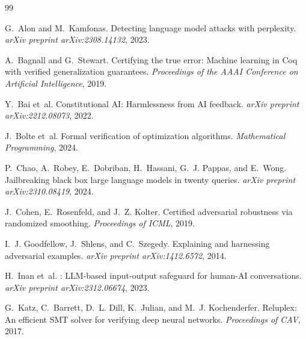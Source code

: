 \documentclass[11pt]{article}
\begin{document}

\begin{thebibliography}{99}

G.~Alon and M.~Kamfonas.
\newblock Detecting language model attacks with perplexity.
\newblock \emph{arXiv preprint arXiv:2308.14132}, 2023.

A.~Bagnall and G.~Stewart.
\newblock Certifying the true error: Machine learning in {Coq} with
  verified generalization guarantees.
\newblock \emph{Proceedings of the AAAI Conference on Artificial
Intelligence}, 2019.

Y.~Bai et~al.
\newblock Constitutional {AI}: Harmlessness from {AI} feedback.
\newblock \emph{arXiv preprint arXiv:2212.08073}, 2022.

J.~Bolte et~al.
\newblock Formal verification of optimization algorithms.
\newblock \emph{Mathematical Programming}, 2024.

P.~Chao, A.~Robey, E.~Dobriban, H.~Hassani, G.~J. Pappas, and
E.~Wong.
\newblock Jailbreaking black box large language models in twenty queries.
\newblock \emph{arXiv preprint arXiv:2310.08419}, 2024.

J.~Cohen, E.~Rosenfeld, and J.~Z. Kolter.
\newblock Certified adversarial robustness via randomized smoothing.
\newblock \emph{Proceedings of ICML}, 2019.

I.~J. Goodfellow, J.~Shlens, and C.~Szegedy.
\newblock Explaining and harnessing adversarial examples.
\newblock \emph{arXiv preprint arXiv:1412.6572}, 2014.

H.~Inan et~al.
: {LLM}-based input-output safeguard for
  human-{AI} conversations.
\newblock \emph{arXiv preprint arXiv:2312.06674}, 2023.

G.~Katz, C.~Barrett, D.~L. Dill, K.~Julian, and
M.~J. Kochenderfer.
\newblock Reluplex: An efficient {SMT} solver for verifying deep neural
  networks.
\newblock \emph{Proceedings of CAV}, 2017.


\end{thebibliography}
\end{document}
